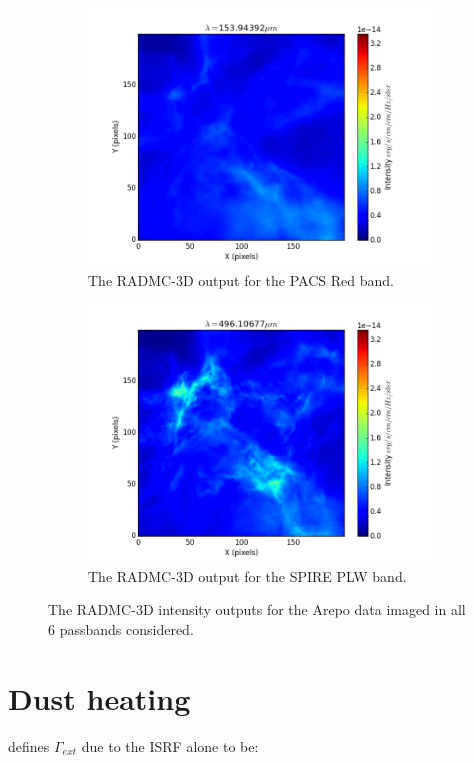 \documentclass{report}
\begin{document}
\begin{figure}[H]
\begin{subfigure}[b]{.45\linewidth}
\includegraphics[width=\linewidth]{../img/sph/red.png}
\caption{The RADMC-3D output for the PACS Red band.}\label{fig:sphred}
\end{subfigure}
\begin{subfigure}[b]{.45\linewidth}
\includegraphics[width=\linewidth]{../img/sph/plw.png}
\caption{The RADMC-3D output for the SPIRE PLW band.}\label{fig:sphplw}
\end{subfigure}
\caption{The RADMC-3D intensity outputs for the Arepo data imaged in all 6 passbands considered.} \label{fig:sph-output}
\end{figure}

\section*{Dust heating}
\textcite{treecol} defines $\Gamma_{ext}$ due to the ISRF alone to be:
\end{document}
